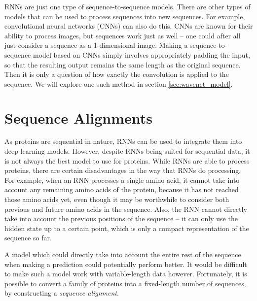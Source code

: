 RNNs are just one type of sequence-to-sequence models. There are other types of models that can be used to process sequences into new sequences. For example, convolutional neural networks (CNNs) can also do this. CNNs are known for their ability to process images, but sequences work just as well -- one could after all just consider a sequence as a 1-dimensional image. Making a sequence-to-sequence model based on CNNs simply involves appropriately padding the input, so that the resulting output remains the same length as the original sequence. Then it is only a question of how exactly the convolution is applied to the sequence. We will explore one such method in section \ref{sec:wavenet_model}.


\section{Sequence Alignments}
\label{sec:sequence_alignments}
As proteins are sequential in nature, RNNs can be used to integrate them into deep learning models. However, despite RNNs being suited for sequential data, it is not always the best model to use for proteins. While RNNs are able to process proteins, there are certain disadvantages in the way that RNNs do processing. For example, when an RNN processes a single amino acid, it cannot take into account any remaining amino acids of the protein, because it has not reached those amino acids yet, even though it may be worthwhile to consider both previous and future amino acids in the sequence. Also, the RNN cannot directly take into account the previous positions of the sequence -- it can only use the hidden state up to a certain point, which is only a compact representation of the sequence so far.

A model which could directly take into account the entire rest of the sequence when making a prediction could potentially perform better. It would be difficult to make such a model work with variable-length data however. Fortunately, it is possible to convert a family of proteins into a fixed-length number of sequences, by constructing a \textit{sequence alignment}.

